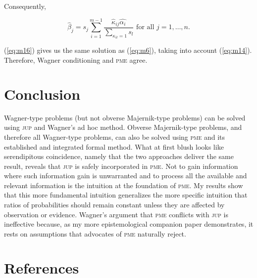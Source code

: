 \documentclass[11pt]{article}
\begin{document}
Consequently,

\begin{equation}
  \label{eq:m16}
  \hat{\beta}_{j}=s_{j}\sum_{i=1}^{m-1}\frac{\hat{\kappa}_{ij}\hat{\alpha_{i}}}{\sum_{\kappa_{il}=1}s_{l}}\mbox{ for all }j=1,\ldots,n.
\end{equation}

(\ref{eq:m16}) gives us the same solution as (\ref{eq:m6}), taking
into account (\ref{eq:m14}). Therefore, Wagner conditioning and
\textsc{pme} agree.

\section{Conclusion}
\label{Conclusion}

Wagner-type problems (but not obverse Majernik-type problems) can be
solved using \textsc{jup} and Wagner's ad hoc method. Obverse
Majernik-type problems, and therefore all Wagner-type problems, can
also be solved using \textsc{pme} and its established and integrated
formal method. What at first blush looks like serendipitous
coincidence, namely that the two approaches deliver the same result,
reveals that \textsc{jup} is safely incorporated in \textsc{pme}. Not
to gain information where such information gain is unwarranted and to
process all the available and relevant information is the intuition at
the foundation of \textsc{pme}. My results show that this more
fundamental intuition generalizes the more specific intuition that
ratios of probabilities should remain constant unless they are
affected by observation or evidence. Wagner's argument that
\textsc{pme} conflicts with \textsc{jup} is ineffective because, as my
more epistemological companion paper demonstrates, it rests on
assumptions that advocates of \textsc{pme} naturally reject.

\section{References}
\label{References}



\end{document}
